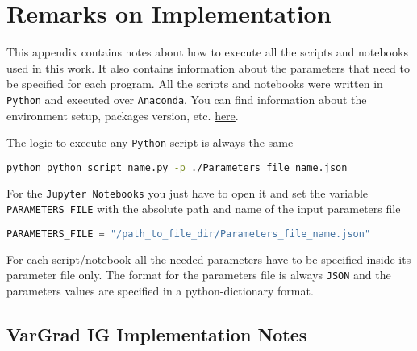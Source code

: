 
\chapter{Remarks on Implementation}
\label{Appendix-Implementation}

This appendix contains notes about how to execute all the scripts and notebooks used in this work. It also contains information about the parameters that need to be specified for each program.
All the scripts and notebooks were written in \texttt{Python} and executed over \texttt{Anaconda}. You can find information about the environment setup, packages version, etc. \href{https://github.com/andresbecker/master_thesis}{here}.

The logic to execute any \texttt{Python} script is always the same
\begin{lstlisting}[language=Bash]
python python_script_name.py -p ./Parameters_file_name.json
\end{lstlisting}

For the \texttt{Jupyter Notebooks} you just have to open it and set the variable \texttt{PARAMETERS\_FILE} with the absolute path and name of the input parameters file
\begin{lstlisting}[language=Python]
PARAMETERS_FILE = "/path_to_file_dir/Parameters_file_name.json"
\end{lstlisting}

For each script/notebook all the needed parameters have to be specified inside its parameter file only. The format for the parameters file is always \texttt{JSON} and the parameters values are specified in a python-dictionary format.


\section{VarGrad IG Implementation Notes}
\label{sec:appendix:VarGrad_IG_Experimental_Setup}



